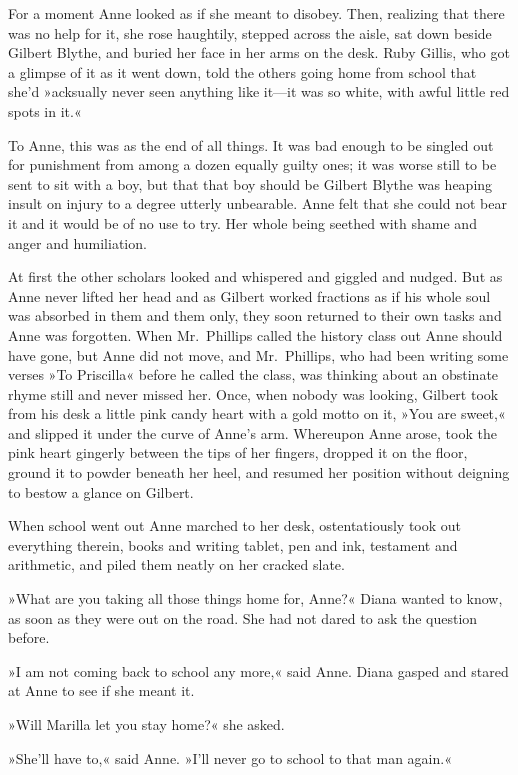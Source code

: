 For a moment Anne looked as if she meant to disobey. Then, realizing that there was no help for it, she rose haughtily, stepped across the aisle, sat down beside Gilbert Blythe, and buried her face in her arms on the desk. Ruby Gillis, who got a glimpse of it as it went down, told the others going home from school that she'd »acksually never seen anything like it—it was so white, with awful little red spots in it.«

To Anne, this was as the end of all things. It was bad enough to be singled out for punishment from among a dozen equally guilty ones; it was worse still to be sent to sit with a boy, but that that boy should be Gilbert Blythe was heaping insult on injury to a degree utterly unbearable. Anne felt that she could not bear it and it would be of no use to try. Her whole being seethed with shame and anger and humiliation.

At first the other scholars looked and whispered and giggled and nudged. But as Anne never lifted her head and as Gilbert worked fractions as if his whole soul was absorbed in them and them only, they soon returned to their own tasks and Anne was forgotten. When Mr.~Phillips called the history class out Anne should have gone, but Anne did not move, and Mr.~Phillips, who had been writing some verses »To Priscilla« before he called the class, was thinking about an obstinate rhyme still and never missed her. Once, when nobody was looking, Gilbert took from his desk a little pink candy heart with a gold motto on it, »You are sweet,« and slipped it under the curve of Anne's arm. Whereupon Anne arose, took the pink heart gingerly between the tips of her fingers, dropped it on the floor, ground it to powder beneath her heel, and resumed her position without deigning to bestow a glance on Gilbert.

When school went out Anne marched to her desk, ostentatiously took out everything therein, books and writing tablet, pen and ink, testament and arithmetic, and piled them neatly on her cracked slate.

»What are you taking all those things home for, Anne?« Diana wanted to know, as soon as they were out on the road. She had not dared to ask the question before.

»I am not coming back to school any more,« said Anne. Diana gasped and stared at Anne to see if she meant it.

»Will Marilla let you stay home?« she asked.

»She'll have to,« said Anne. »I'll never go to school to that man again.«

